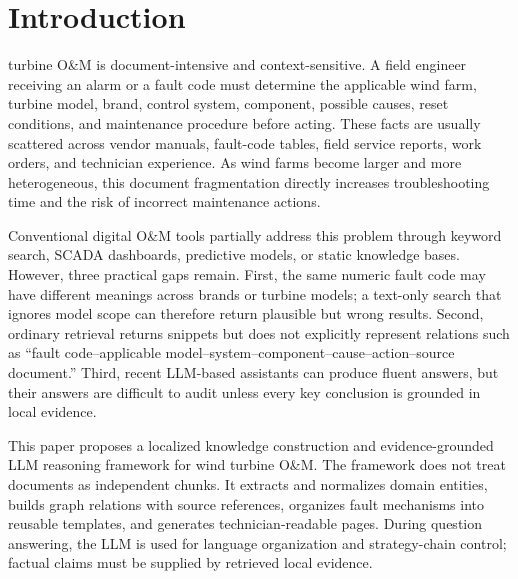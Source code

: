 \documentclass[lettersize,journal]{IEEEtran}
\begin{document}
\section{Introduction}
 turbine O\&M is document-intensive and context-sensitive. A field engineer receiving an alarm or a fault code must determine the applicable wind farm, turbine model, brand, control system, component, possible causes, reset conditions, and maintenance procedure before acting. These facts are usually scattered across vendor manuals, fault-code tables, field service reports, work orders, and technician experience. As wind farms become larger and more heterogeneous, this document fragmentation directly increases troubleshooting time and the risk of incorrect maintenance actions.

Conventional digital O\&M tools partially address this problem through keyword search, SCADA dashboards, predictive models, or static knowledge bases. However, three practical gaps remain. First, the same numeric fault code may have different meanings across brands or turbine models; a text-only search that ignores model scope can therefore return plausible but wrong results. Second, ordinary retrieval returns snippets but does not explicitly represent relations such as ``fault code--applicable model--system--component--cause--action--source document.'' Third, recent LLM-based assistants can produce fluent answers, but their answers are difficult to audit unless every key conclusion is grounded in local evidence.

This paper proposes a localized knowledge construction and evidence-grounded LLM reasoning framework for wind turbine O\&M. The framework does not treat documents as independent chunks. It extracts and normalizes domain entities, builds graph relations with source references, organizes fault mechanisms into reusable templates, and generates technician-readable pages. During question answering, the LLM is used for language organization and strategy-chain control; factual claims must be supplied by retrieved local evidence.
\end{document}

